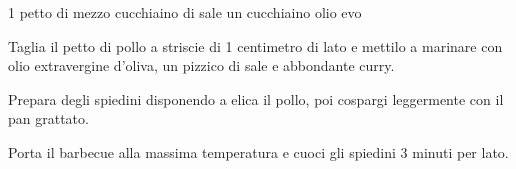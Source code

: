 \begin{ingreds}
	1 petto di 
	mezzo cucchiaino di sale
	un cucchiaino 
	olio evo
\end{ingreds}

\begin{method}
Taglia il petto di pollo a striscie di 1 centimetro di lato e mettilo a marinare con olio extravergine d'oliva, un pizzico di sale e abbondante curry.

Prepara degli spiedini disponendo a elica il pollo, poi cospargi leggermente con il pan grattato.

Porta il barbecue alla massima temperatura e cuoci gli spiedini 3 minuti per lato.
\end {method}

